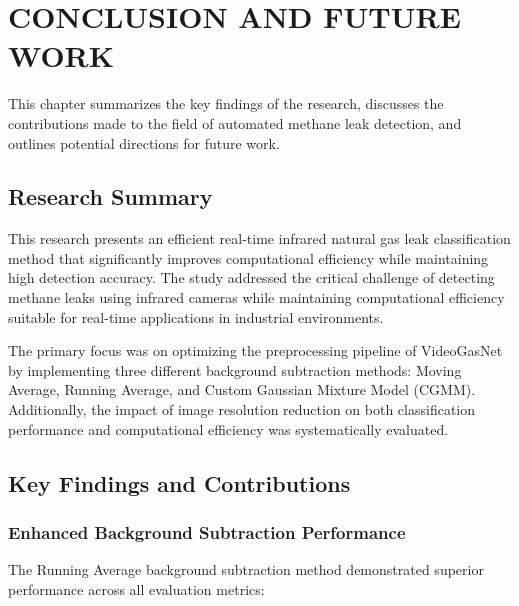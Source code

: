 \chapter{CONCLUSION AND FUTURE WORK}

This chapter summarizes the key findings of the research, discusses the contributions made to the field of automated methane leak detection, and outlines potential directions for future work.

\section{Research Summary}

This research presents an efficient real-time infrared natural gas leak classification method that significantly improves computational efficiency while maintaining high detection accuracy. The study addressed the critical challenge of detecting methane leaks using infrared cameras while maintaining computational efficiency suitable for real-time applications in industrial environments.

The primary focus was on optimizing the preprocessing pipeline of VideoGasNet by implementing three different background subtraction methods: Moving Average, Running Average, and Custom Gaussian Mixture Model (CGMM). Additionally, the impact of image resolution reduction on both classification performance and computational efficiency was systematically evaluated.

\section{Key Findings and Contributions}

\subsection{Enhanced Background Subtraction Performance}

The Running Average background subtraction method demonstrated superior performance across all evaluation metrics:

